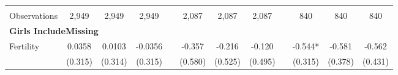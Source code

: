 \begin{landscape}
\begin{table}[htpb!]
\begin{center}
\begin{tabular}{lcccp{2mm}cccp{2mm}ccc}
\begin{footnotesize}\end{footnotesize}&\begin{footnotesize}\end{footnotesize}&\begin{footnotesize}\end{footnotesize}&\begin{footnotesize}\end{footnotesize}&\begin{footnotesize}\end{footnotesize}&\begin{footnotesize}\end{footnotesize}&\begin{footnotesize}\end{footnotesize}&\begin{footnotesize}\end{footnotesize}&\begin{footnotesize}\end{footnotesize}&\begin{footnotesize}\end{footnotesize}&\begin{footnotesize}\end{footnotesize}&\begin{footnotesize}\end{footnotesize}\\Observations&2,949&2,949&2,949&&2,087&2,087&2,087&&840&840&840\\
\multicolumn{12}{l}{\textbf{Girls IncludeMissing}}\\ 
Fertility&0.0358&0.0103&-0.0356&&-0.357&-0.216&-0.120&&-0.544*&-0.581&-0.562\\
&(0.315)&(0.314)&(0.315)&&(0.580)&(0.525)&(0.495)&&(0.315)&(0.378)&(0.431)\\

\end{tabular}
\end{center}
\end{table}
\end{landscape}
